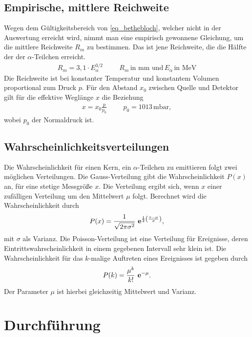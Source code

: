 \subsection{Empirische, mittlere Reichweite}
Wegen dem Gültigkeitsbereich von \eqref{eq_bethebloch}, welcher nicht in der Auswertung erreicht wird, nimmt man eine empirisch gewonnene
Gleichung, um die mittlere Reichweite $R_m$ zu bestimmen. Das ist jene Reichweite, die die Hälfte der der $\alpha$-Teilchen erreicht.
\begin{align}
 R_m = 3,1\cdot E^{3/2}_\alpha  \hspace{1cm} R_m \, \text{in mm und}\, E_\alpha\, \text{in MeV}
 \label{eq_reichweite_empirisch}
\end{align}
Die Reichweite ist bei konstanter Temperatur und konstantem Volumen proportional zum Druck $p$. Für den Abstand $x_0$ zwischen Quelle und Detektor
gilt für die effektive Weglänge $x$ die Beziehung
\begin{align}
 x = x_0 \frac{p}{p_0} \hspace{1cm} p_0 = 1013\, \text{mbar},
\end{align}
wobei $p_0$ der Normaldruck ist. 

\subsection{Wahrscheinlichkeitsverteilungen}
Die Wahrscheinlichkeit für einen Kern, ein $\alpha$-Teilchen zu emittieren folgt zwei möglichen Verteilungen. Die Gauss-Verteilung gibt
die Wahrscheinlichkeit $P(x)$ an, für eine stetige Messgröße $x$. Die Verteilung ergibt sich, wenn $x$ einer zufälligen Verteilung um den Mittelwert
$\mu$ folgt. Berechnet wird die Wahrscheinlichkeit durch
\begin{align}
 P(x) = \frac{1}{\sqrt{2\pi \sigma^2}} \ \mathbf{e}^{\frac12\left(\frac{x-\mu}{\sigma} \right)},
 \label{eq_gauss}
\end{align}
mit $\sigma$ als Varianz. Die Poisson-Verteilung ist eine Verteilung für Ereignisse, deren Eintrittswahrscheinlichkeit in einem gegebenen
Intervall sehr klein ist. Die Wahrscheinlichkeit für das $k$-malige Auftreten eines Ereignisses ist gegeben durch
\begin{align}
 P(k) = \frac{\mu^k}{k!}\ \mathbf{e}^{-\mu}.
 \label{eq_poisson}
\end{align}
Der Parameter $\mu$ ist hierbei gleichzeitig Mittelwert und Varianz.

\section{Durchführung}


